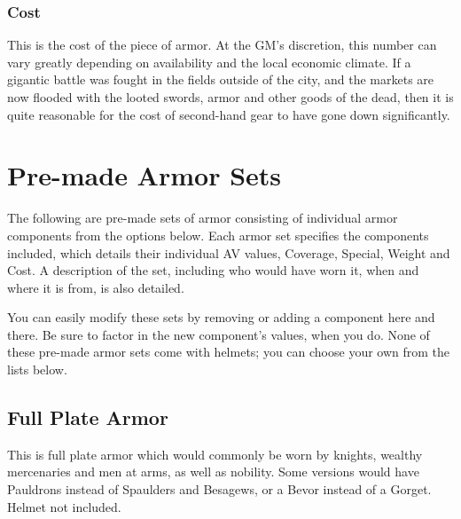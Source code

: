 \documentclass[oneside,11pt,english]{book}
\begin{document}
\subsubsection{Cost}
This is the cost of the piece of armor. At the GM’s discretion, this number can vary greatly depending on availability 
and the local economic climate. If a gigantic battle was fought in the fields outside of the city, and the markets are 
now flooded with the looted swords, armor and other goods of the dead, then it is quite reasonable for the cost of 
second-hand gear to have gone down significantly.

\section{Pre-made Armor Sets}
The following are pre-made sets of armor consisting of individual armor components from the options below. Each 
armor set specifies the components included, which details their individual AV values, Coverage, Special, Weight and 
Cost. A description of the set, including who would have worn it, when and where it is from, is also detailed. 

You can easily modify these sets by removing or adding a component here and
there. Be sure to factor in the new component’s values, when you do. None of
these pre-made armor sets come with helmets; you can choose your own from the
lists below. 

\subsection*{Full Plate Armor}
This is full plate armor which would commonly be worn by knights, wealthy mercenaries and men at arms, as well as 
nobility. Some versions would have Pauldrons instead of Spaulders and Besagews, or a Bevor instead of a Gorget.
Helmet not included.
\end{document}
